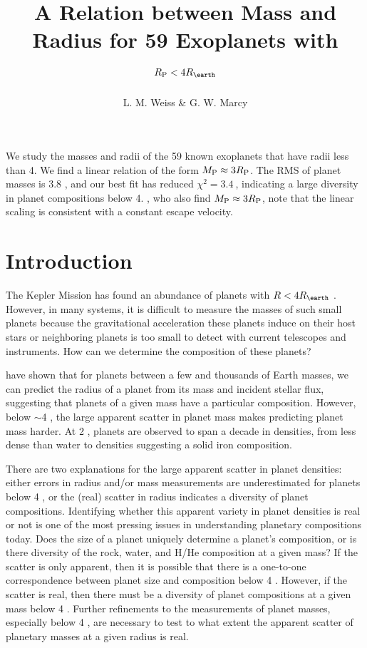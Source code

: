 \documentclass[11pt]{aastex}
\title{A Relation between Mass and Radius for 59 Exoplanets with $\rpl <  \rspecial$}
\author{L. M. Weiss \& G. W. Marcy}
\newcommand{\chisquared}{3.4~}
\newcommand{\rms}{3.8 \mearth}
\begin{document}
\maketitle
We study the masses and radii of the 59 known exoplanets that have radii less than 4\rearth.  We find a linear relation of the form $M_{\rm P} \approx 3R_{\rm P}$.  The RMS of planet masses is \rms, and our best fit has reduced $\chi^2=\chisquared$, indicating a large diversity in planet compositions below 4\rearth.  \citet{WL2013}, who also find $M_{\rm P} \approx 3R_{\rm P}$, note that the linear scaling is consistent with a constant escape velocity.

\section{Introduction}

The Kepler Mission has found an abundance of planets with  $R < 4 \rearth$ \citep{Batalha2012}.  However, in many systems, it is difficult to measure the masses of such small planets because the gravitational acceleration these planets induce on their host stars or neighboring planets is too small to detect with current telescopes and instruments.  How can we determine the composition of these planets?

\citet{Weiss2013} have shown that for planets between a few and thousands of Earth masses, we can predict the radius of a planet from its mass and incident stellar flux, suggesting that planets of a given mass have a particular composition.  However, below $\sim$4 \rearth, the large apparent scatter in planet mass makes predicting planet mass harder.  At 2 \rearth, planets are observed to span a decade in densities, from less dense than water to densities suggesting a solid iron composition.

There are two explanations for the large apparent scatter in planet densities: either errors in radius and/or mass measurements are underestimated for planets below 4 \rearth, or the (real) scatter in radius indicates a diversity of planet compositions.   Identifying whether this apparent variety in planet densities is real or not is one of the most pressing issues in understanding planetary compositions today.  Does the size of a planet uniquely determine a planet's composition, or is there diversity of the rock, water, and H/He composition at a given mass?  If the scatter is only apparent, then it is possible that there is a one-to-one correspondence between planet size and composition below 4 \rearth.  However, if the scatter is real, then there must be a diversity of planet compositions at a given mass below 4 \rearth.  Further refinements to the measurements of planet masses, especially below 4 \rearth, are necessary to test to what extent the apparent scatter of planetary masses at a given radius is real.
\end{document}
